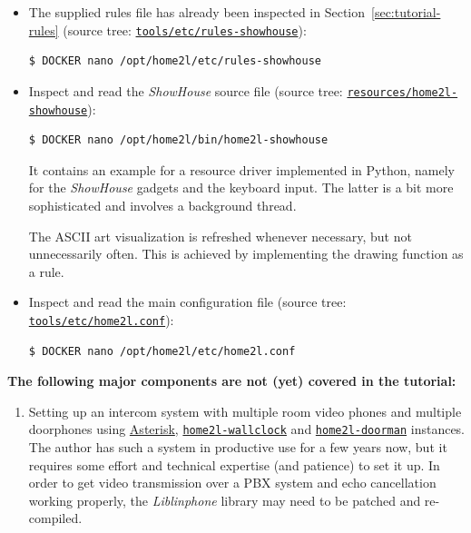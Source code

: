 \documentclass[12pt,english,parskip=half,headheight=19pt]{scrreprt}
\newcommand{\idx}[1]{#1\index{#1}}
\newcommand{\reftool}[1]{\hyperref[tool:#1]{\texttt{\idx{#1}}}}
\newcommand{\refsrc}[1]{\href{#1}{\texttt{#1}}}     %
\begin{document}
\begin{itemize}[$\blacktriangleright$]

\item
  The supplied rules file has already been inspected in Section~\ref{sec:tutorial-rules}
  (source tree: \refsrc{tools/etc/rules-showhouse}):
  \begin{lstlisting}[language=bash]
    $ DOCKER nano /opt/home2l/etc/rules-showhouse
  \end{lstlisting}

\item
  Inspect and read the \textit{ShowHouse} source file
  (source tree: \refsrc{resources/home2l-showhouse}):
  \begin{lstlisting}[language=bash]
    $ DOCKER nano /opt/home2l/bin/home2l-showhouse
  \end{lstlisting}

  It contains an example for a resource driver implemented in Python,
  namely for the \textit{ShowHouse} gadgets and the keyboard input. The
  latter is a bit more sophisticated and involves a background thread.

  The ASCII art visualization is refreshed whenever necessary, but not
  unnecessarily often. This is achieved by implementing the drawing function as a rule.

\item
  Inspect and read the main configuration file (source tree: \refsrc{tools/etc/home2l.conf}):
  \begin{lstlisting}[language=bash]
    $ DOCKER nano /opt/home2l/etc/home2l.conf
  \end{lstlisting}

\end{itemize}

\textbf{The following major components are not (yet) covered in the tutorial:}
\begin{enumerate}

  \item
    Setting up an intercom system with multiple room video phones and multiple
    doorphones using \href{https://www.asterisk.org/}{Asterisk}, \reftool{home2l-wallclock}
    and \reftool{home2l-doorman} instances. The author has such a system in productive use for
    a few years now, but it requires some effort and technical expertise (and patience) to set it up.
    In order to get video transmission over a PBX system and echo cancellation working properly,
    the \textit{Liblinphone} library may need to be patched and re-compiled.

\end{enumerate}
\end{document}
